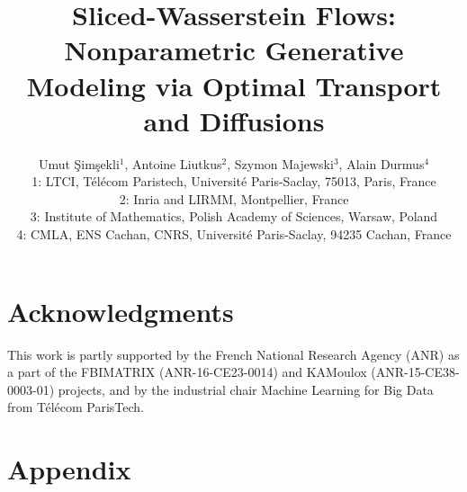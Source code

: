 \documentclass[11pt]{article}
\begin{document}
\title{Sliced-Wasserstein Flows: Nonparametric Generative Modeling via Optimal Transport and Diffusions}
\author{Umut \c{S}im\c{s}ekli$^{\text{1}}$, Antoine Liutkus$^{\text{2}}$, Szymon Majewski$^{\text{3}}$, Alain Durmus$^{\text{4}}$  \vspace{3pt} \\
{\small 1: LTCI, T\'{e}l\'{e}com Paristech, Universit\'{e} Paris-Saclay, 75013, Paris, France }\\
{\small 2: Inria and LIRMM, Montpellier, France}\\
{\small 3: Institute of Mathematics, Polish Academy of Sciences, Warsaw, Poland}\\
{\small 4: CMLA, ENS Cachan, CNRS, Université Paris-Saclay, 94235 Cachan, France }}
\date{}

\maketitle





\tableofcontents















\section*{Acknowledgments}

This work is partly supported by the French National Research Agency (ANR) as a part of the FBIMATRIX (ANR-16-CE23-0014) and KAMoulox (ANR-15-CE38-0003-01) projects, and by the industrial chair Machine Learning for Big Data from T\'{e}l\'{e}com ParisTech.





\section*{Appendix}



% 
\end{document}
